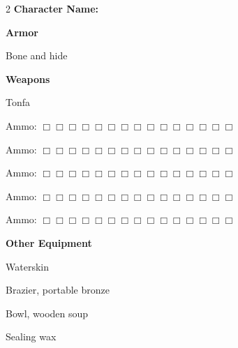 \documentclass[10pt]{article}
\begin{document}
\begin{multicols}{2}
\textbf{Character Name:} \hrulefill

\vspace{24pt}

\textbf{Armor}


Bone and hide




\hrulefill


\hrulefill


\hrulefill



\vspace{24pt}

\textbf{Weapons}


Tonfa




\hrulefill

Ammo: $\Box \Box \Box \Box \Box \Box \Box \Box \Box \Box \Box \Box \Box \Box \Box$ 


\hrulefill

Ammo: $\Box \Box \Box \Box \Box \Box \Box \Box \Box \Box \Box \Box \Box \Box \Box$ 


\hrulefill

Ammo: $\Box \Box \Box \Box \Box \Box \Box \Box \Box \Box \Box \Box \Box \Box \Box$ 


\hrulefill

Ammo: $\Box \Box \Box \Box \Box \Box \Box \Box \Box \Box \Box \Box \Box \Box \Box$ 


\hrulefill

Ammo: $\Box \Box \Box \Box \Box \Box \Box \Box \Box \Box \Box \Box \Box \Box \Box$ 



\vspace{24pt}

\textbf{Other Equipment}


Waterskin


Brazier, portable bronze


Bowl, wooden soup


Sealing wax




\hrulefill


\hrulefill


\hrulefill


\hrulefill


\hrulefill


\hrulefill


\hrulefill


\hrulefill



\end{multicols}
\end{document}
